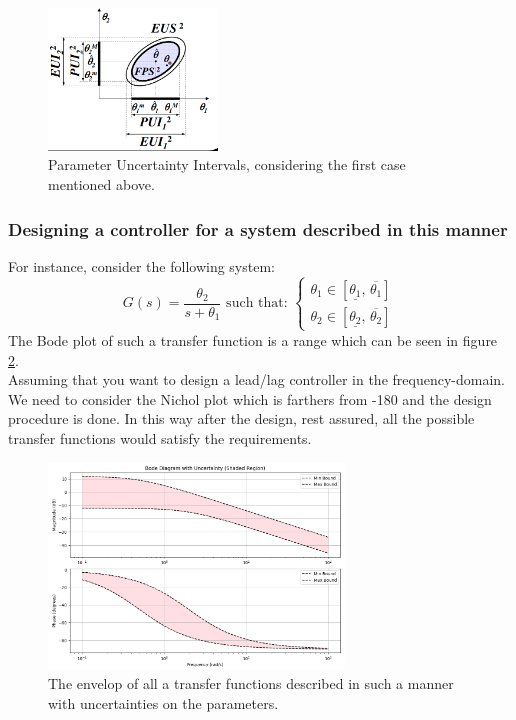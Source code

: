 \begin{figure}[htbp]  %
    \centering
    \includegraphics[width=0.4\textwidth]{images/pui2.png}
    \caption{Parameter Uncertainty Intervals, considering the first case mentioned above.}
    \label{fig:PUI}
\end{figure}
\newpage

\subsubsection{Designing a controller for a system described in this manner}
For instance, consider the following system:\\
\[
G(s) = \frac{\theta_2}{s + \theta_1}
\text{ such that: }
\begin{cases}
\theta_1 \in \left[\underline{\theta_1}, \, \overline{\theta_1} \right] \\
\theta_2 \in \left[\underline{\theta_2}, \, \overline{\theta_2} \right]
\end{cases}
\]
The Bode plot of such a transfer function is a range which can be seen in figure \ref{fig:bode_PUI}.\\

Assuming that you want to design a lead/lag controller in the frequency-domain. We need to consider the Nichol plot which is farthers from -180 and the design procedure is done. In this way after the design, rest assured, all the possible transfer functions would satisfy the requirements.

\begin{figure}[htbp]  %
    \centering
    \includegraphics[width=0.7\textwidth]{images/bode_PUI.png}
    \caption{The envelop of all a transfer functions described in such a manner with uncertainties on the parameters.}
    \label{fig:bode_PUI}
\end{figure}


